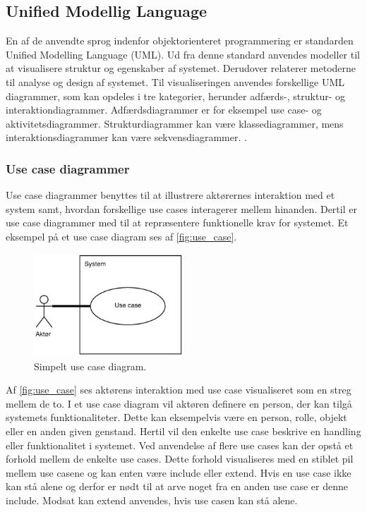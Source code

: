 \subsection{Unified Modellig Language}
En af de anvendte sprog indenfor objektorienteret programmering er standarden Unified Modelling Language (UML). Ud fra denne standard anvendes modeller til at visualisere struktur og egenskaber af systemet. Derudover relaterer metoderne til analyse og design af systemet. Til visualiseringen anvendes forskellige UML diagrammer, som kan opdeles i tre kategorier, herunder adfærds-, struktur- og interaktiondiagrammer. Adfærdsdiagrammer er for eksempel use case- og  aktivitetsdiagrammer. Strukturdiagrammer kan være klassediagrammer, mens interaktionsdiagrammer kan være sekvensdiagrammer. \cite{Fowler2004, Williams2004}.


\subsubsection{Use case diagrammer} 
Use case diagrammer benyttes til at illustrere aktørernes interaktion med et system samt, hvordan forskellige use cases interagerer mellem hinanden. Dertil er use case diagrammer med til at repræsentere funktionelle krav for systemet. \cite{Williams2004} Et eksempel på et use case diagram ses af \autoref{fig:use_case}.

\begin{figure} [H]
\centering
\includegraphics[width=0.5\textwidth]{figures/USE_CASE2}
\caption{Simpelt use case diagram.}
\label{fig:use_case}
\end{figure}

\noindent
Af \autoref{fig:use_case} ses aktørens interaktion med use case visualiseret som en streg mellem de to. I et use case diagram vil aktøren definere en person, der kan tilgå systemets funktionaliteter. Dette kan eksempelvis være en person, rolle, objekt eller en anden given genstand. Hertil vil den enkelte use case beskrive en handling eller funktionalitet i systemet. Ved anvendelse af flere use cases kan der opstå et forhold mellem de enkelte use cases. Dette forhold visualiseres med en stiblet pil mellem use casene og kan enten være include eller extend. Hvis en use case ikke kan stå alene og derfor er nødt til at arve noget fra en anden use case er denne include. Modsat kan extend anvendes, hvis use casen kan stå alene. \cite{Fowler2004, Williams2004}


